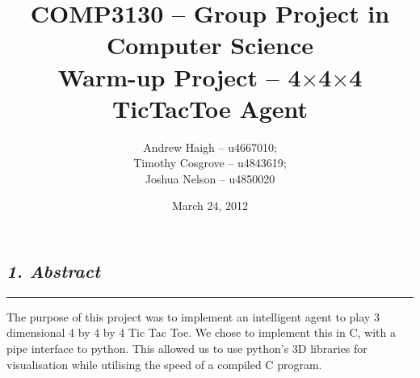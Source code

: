 \documentclass[10pt]{article}
\begin{document}
\title{COMP3130 -- Group Project in Computer Science\\ Warm-up Project -- 4$\times$4$\times$4 TicTacToe Agent}
\date{March 24, 2012}
\author{Andrew Haigh -- u4667010;\\ Timothy Cosgrove -- u4843619;\\ Joshua Nelson -- u4850020}
\maketitle

\setlength{\columnsep}{18.0pt}
\begin{multicols}{2}
\subsection*{\emph { \textmd{1. Abstract}}}
\hrule
\vspace{0.4cm}
The purpose of this project was to implement an intelligent agent to play 3
dimensional 4 by 4 by 4 Tic Tac Toe. We chose to implement this in C, with a
pipe interface to python. This allowed us to use python's 3D libraries for visualisation
while utilising the speed of a compiled C program.


\end{multicols}
\end{document}
